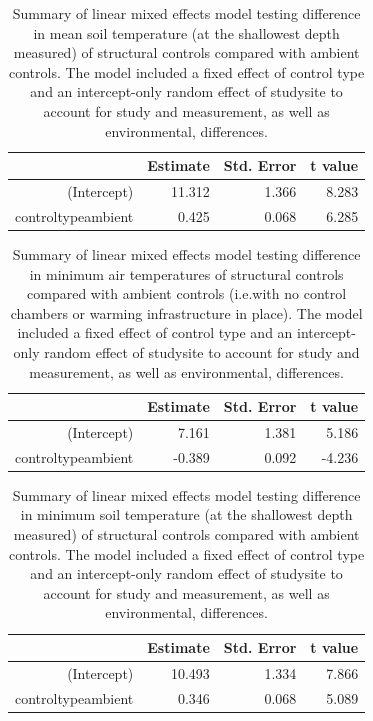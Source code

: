 \documentclass{article}
\begin{document}
\par
\begin{table}[ht]
\centering
\begin{tabular}{rrrr}
  \hline
 & Estimate & Std. Error & t value \\ 
  \hline
(Intercept) & 11.312 & 1.366 & 8.283 \\ 
  controltypeambient & 0.425 & 0.068 & 6.285 \\ 
   \hline
\end{tabular}
\caption{Summary of linear mixed effects model testing difference in mean soil temperature (at the shallowest depth measured) of structural controls compared with ambient controls. The model included a fixed effect of control type and an intercept-only random effect of studysite to account for study and measurement, as well as environmental, differences.} 
\end{table}
\par
\begin{table}[ht]
\centering
\begin{tabular}{rrrr}
  \hline
 & Estimate & Std. Error & t value \\ 
  \hline
(Intercept) & 7.161 & 1.381 & 5.186 \\ 
  controltypeambient & -0.389 & 0.092 & -4.236 \\ 
   \hline
\end{tabular}
\caption{Summary of linear mixed effects model testing difference in minimum air temperatures of structural controls compared with ambient controls (i.e.with no control chambers or warming infrastructure in place). The model included a fixed effect of control type and an intercept-only random effect of studysite to account for study and measurement, as well as environmental, differences.} 
\end{table}\par
\begin{table}[ht]
\centering
\begin{tabular}{rrrr}
  \hline
 & Estimate & Std. Error & t value \\ 
  \hline
(Intercept) & 10.493 & 1.334 & 7.866 \\ 
  controltypeambient & 0.346 & 0.068 & 5.089 \\ 
   \hline
\end{tabular}
\caption{Summary of linear mixed effects model testing difference in minimum soil temperature (at the shallowest depth measured) of structural controls compared with ambient controls. The model included a fixed effect of control type and an intercept-only random effect of studysite to account for study and measurement, as well as environmental, differences.} 
\end{table} 
\end{document}
